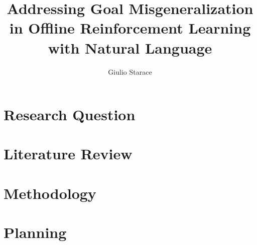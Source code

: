 \documentclass[12pt]{article}
\title{Addressing Goal Misgeneralization in Offline Reinforcement Learning with Natural Language}
\begin{document}
\author{Giulio Starace}
\maketitle
\section{Research Question}

\section{Literature Review}

\section{Methodology}
\section{Planning}



\end{document}
